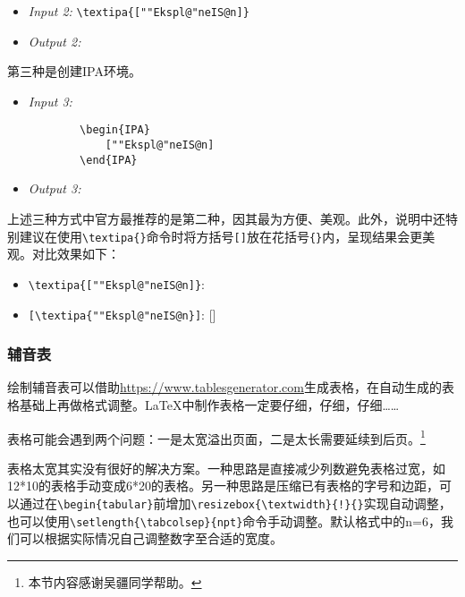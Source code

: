 \documentclass[a4paper,12pt]{article}
\begin{document}
\begin{itemize}
	\item \textit{Input 2:} \verb||
	\item \textit{Output 2:} \textipa{[""Ekspl@"neIS@n]}
\end{itemize}

第三种是创建IPA环境。

\begin{itemize}
	\item \textit{Input 3:}
		\begin{Verbatim}
		\begin{IPA}
			[""Ekspl@"neIS@n]
		\end{IPA}
		\end{Verbatim}
	\item \textit{Output 3:} 
	\begin{IPA}
	\end{IPA}
\end{itemize}

上述三种方式中官方最推荐的是第二种，因其最为方便、美观。此外，说明中还特别建议在使用\verb|\textipa{}|命令时将方括号\verb|[]|放在花括号\verb|{}|内，呈现结果会更美观。对比效果如下：

\begin{itemize}
	\item \verb||: \textipa{[""Ekspl@"neIS@n]}
	\item \verb|[]|: [\textipa{""Ekspl@"neIS@n}]
\end{itemize}

\subsubsection{辅音表}

绘制辅音表可以借助\href{https://www.tablesgenerator.com}{https://www.tablesgenerator.com}生成表格，在自动生成的表格基础上再做格式调整。LaTeX中制作表格一定要仔细，仔细，仔细……

\vspace{3mm}
表格可能会遇到两个问题：一是太宽溢出页面，二是太长需要延续到后页。\footnote{本节内容感谢吴疆同学帮助。}

表格太宽其实没有很好的解决方案。一种思路是直接减少列数避免表格过宽，如12*10的表格手动变成6*20的表格。另一种思路是压缩已有表格的字号和边距，可以通过在\verb|\begin{tabular}|前增加\verb|\resizebox{\textwidth}{!}{}|实现自动调整，也可以使用\verb|\setlength{\tabcolsep}{npt}|命令手动调整。默认格式中的n=6，我们可以根据实际情况自己调整数字至合适的宽度。
\end{document}
